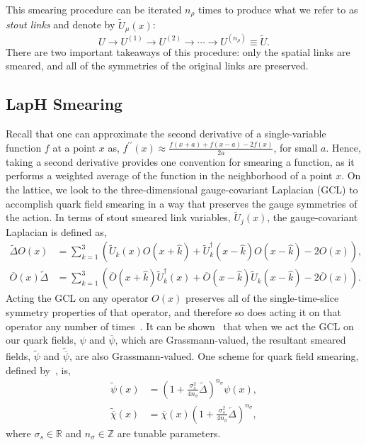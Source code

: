     This smearing procedure can be iterated $n_\rho$ times to produce what we refer to as \textit{stout links} and denote by $\tilde{U}_\mu(x)$:
    \begin{equation}
        U \rightarrow U^{(1)} \rightarrow U^{(2)} \rightarrow \cdots \rightarrow U^{\left(n_{\rho}\right)} \equiv \tilde{U}.
    \end{equation}
    There are two important takeaways of this procedure: only the spatial links are smeared, and all of the symmetries of the original links are preserved.
    
    \subsection{LapH Smearing}
    Recall that one can approximate the second derivative of a single-variable function $f$ at a point $x$ as, $f^{\prime\prime}(x) \approx \frac{f(x+a) + f(x-a) - 2f(x)}{2a}$, for small $a$. Hence, taking a second derivative provides one convention for smearing a function, as it performs a weighted average of the function in the neighborhood of a point $x$. On the lattice, we look to the three-dimensional gauge-covariant Laplacian (GCL) to accomplish quark field smearing in a way that preserves the gauge symmetries of the action. In terms of stout smeared link variables, $\tilde U_j(x)$, the gauge-covariant Laplacian is defined as,
    \begin{equation}\label{eq:quark_smearing}
    \begin{aligned} \tilde{\Delta} O(x) &=\sum_{k=1}^{3}\left(\tilde{U}_{k}(x) O(x+\hat{k})+\tilde{U}_{k}^{\dagger}(x-\hat{k}) O(x-\hat{k})-2 O(x)\right), \\ \overline{O}(x) \overleftarrow{\Delta} &=\sum_{k=1}^{3}\left(\overline{O}(x+\hat{k}) \tilde{U}_{k}^{\dagger}(x)+\overline{O}(x-\hat{k}) \tilde{U}_{k}(x-\hat{k})-2 \overline{O}(x)\right). \end{aligned}
    \end{equation}
    Acting the GCL on any operator $O(x)$ preserves all of the single-time-slice symmetry properties of that operator, and therefore so does acting it on that operator any number of times~\cite{cite:spectroscopy}. It can be shown~\cite{ref:spectroscopy} that when we act the GCL on our quark fields, $\psi$ and $\overline\psi$, which are Grassmann-valued, the resultant smeared fields, $\widetilde{\psi}$ and $\widetilde{\overline\psi}$, are also Grassmann-valued. One scheme for quark field smearing, defined by~\cite{24spectroscopy}, is,
    \begin{equation}
    \begin{aligned} \widetilde{\psi}(x) &=\left(1+\frac{\sigma_{s}^{2}}{4 n_{\sigma}} \widetilde{\Delta}\right)^{n_{\sigma}} \psi(x), \\ \widetilde{\overline\chi}(x) &=\overline{\chi}(x)\left(1+\frac{\sigma_{s}^{2}}{4 n_{\sigma}} \overleftarrow{\Delta}\right)^{n_{\sigma}}, \end{aligned}
    \end{equation}
    where $\sigma_s\in\mathbb{R}$ and $n_\sigma\in\mathbb{Z}$ are tunable parameters.

